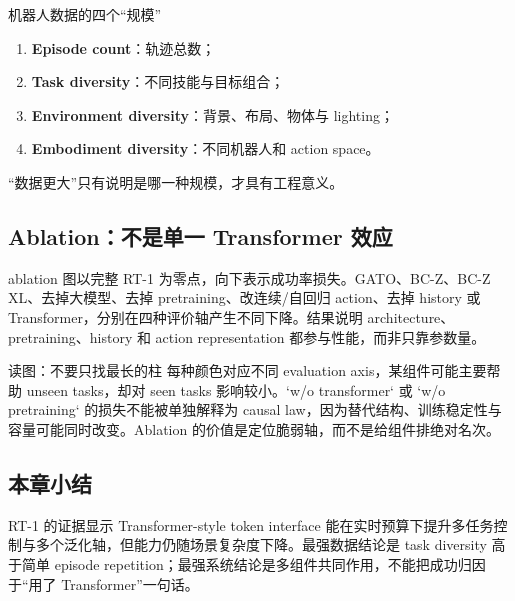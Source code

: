 
\begin{importantbox}{机器人数据的四个“规模”}
\begin{enumerate}
  \item \textbf{Episode count}：轨迹总数；
  \item \textbf{Task diversity}：不同技能与目标组合；
  \item \textbf{Environment diversity}：背景、布局、物体与 lighting；
  \item \textbf{Embodiment diversity}：不同机器人和 action space。
\end{enumerate}
“数据更大”只有说明是哪一种规模，才具有工程意义。
\end{importantbox}

\subsection{Ablation：不是单一 Transformer 效应}

ablation 图以完整 RT-1 为零点，向下表示成功率损失。GATO、BC-Z、BC-Z XL、去掉大模型、去掉 pretraining、改连续/自回归 action、去掉 history 或 Transformer，分别在四种评价轴产生不同下降。结果说明 architecture、pretraining、history 和 action representation 都参与性能，而非只靠参数量。


\begin{knowledgebox}{读图：不要只找最长的柱}
每种颜色对应不同 evaluation axis，某组件可能主要帮助 unseen tasks，却对 seen tasks 影响较小。`w/o transformer` 或 `w/o pretraining` 的损失不能被单独解释为 causal law，因为替代结构、训练稳定性与容量可能同时改变。Ablation 的价值是定位脆弱轴，而不是给组件排绝对名次。
\end{knowledgebox}

\subsection{本章小结}

RT-1 的证据显示 Transformer-style token interface 能在实时预算下提升多任务控制与多个泛化轴，但能力仍随场景复杂度下降。最强数据结论是 task diversity 高于简单 episode repetition；最强系统结论是多组件共同作用，不能把成功归因于“用了 Transformer”一句话。

